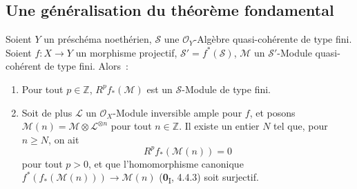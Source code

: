 \subsection{Une généralisation du théorème fondamental}
\label{subsection:III.2.4-fr}

\begin{theorem}[2.4.1]
\label{III.2.4.1-fr}
Soient $Y$ un préschéma noethérien, $\mathcal S$ une
$\mathcal O_Y$-Algèbre quasi-cohérente de type fini. Soient
$f:X\to Y$ un morphisme projectif, $\mathcal S'=f^*(\mathcal S)$,
$\mathcal M$ un $\mathcal S'$-Module quasi-cohérent de type fini.
Alors~:
\begin{enumerate}
\item[\textup{(i)}] Pour tout $p\in\mathbb Z$, $R^pf_*(\mathcal M)$ est un
$\mathcal S$-Module de type fini.
\item[\textup{(ii)}] Soit de plus $\mathcal L$ un $\mathcal O_X$-Module inversible
ample pour $f$, et posons
$\mathcal M(n)=\mathcal M\otimes\mathcal L^{\otimes n}$ pour tout
$n\in\mathbb Z$. Il existe un entier $N$ tel que, pour $n\geq N$, on ait
\[
R^pf_*(\mathcal M(n))=0
\tag{2.4.1.1}\label{III.2.4.1.1-fr}
\]
pour tout $p>0$, et que l'homomorphisme canonique
$f^*(f_*(\mathcal M(n)))\longrightarrow\mathcal M(n)$
\textup{(\textbf{0}\textsubscript{I}, 4.4.3)} soit surjectif.
\end{enumerate}
\end{theorem}

